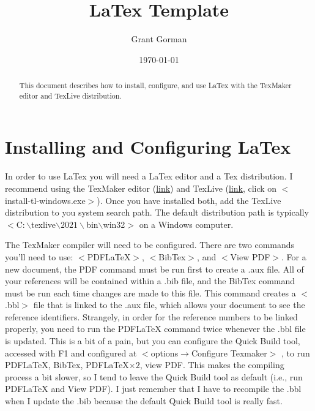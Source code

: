 \documentclass[11pt]{article}		%
\title{LaTex Template}
\author{Grant Gorman}
\date{\today}
\begin{document}
\maketitle

\setlength{\parindent}{0in} %
\setlength{\parskip}{\baselineskip} %

\begin{abstract}
	
	This document describes how to install, configure, and use LaTex with the TexMaker editor and TexLive distribution. 

\end{abstract}

\section{Installing and Configuring LaTex} 
\label{sec:install}
In order to use LaTex you will need a LaTex editor and a Tex distribution. I  recommend using the TexMaker editor (\href{https://www.xm1math.net/texmaker/index.html}{link}) and TexLive (\href{https://www.tug.org/texlive/acquire-netinstall.html}{link}, click on $<$install-tl-windows.exe$>$). Once you have installed both, add the TexLive distribution to you system search path. The default distribution path is typically $<$C$:\backslash $texlive$\backslash 2021\backslash$bin$\backslash$win32$>$ on a Windows computer. 

The TexMaker compiler will need to be configured. There are two commands you'll need to use: $<$PDFLaTeX$>$, $<$BibTex$>$, and $<$View PDF$>$. For a new document, the PDF command must be run first to create a .aux file. All of your references will be contained within a .bib file, and the BibTex command must be run each time changes are made to this file. This command creates a $<$.bbl$>$ file that is linked to the .aux file, which allows your document to see the reference identifiers. Strangely, in order for the reference numbers to be linked properly, you need to run the PDFLaTeX command twice whenever the .bbl file is updated. This is a bit of a pain, but you can configure the Quick Build tool, accessed with F1 and configured at $<$options$\rightarrow$Configure Texmaker$>$
, to run PDFLaTeX, BibTex, PDFLaTeX$\times2$, view PDF. This makes the compiling process a bit slower, so I tend to leave the Quick Build tool as default (i.e., run PDFLaTeX and View PDF). I just remember that I have to recompile the .bbl when I update the .bib because the default Quick Build tool is really fast.
\end{document}
